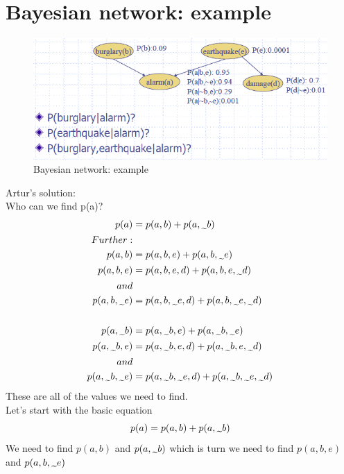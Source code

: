 \documentclass{article}
\newcommand{\midtilde}{\raisebox{-0.25\baselineskip}{\textasciitilde}}
\begin{document}
\section*{Bayesian network: example}
\begin{figure}[H]
 \centering 
\includegraphics[scale=0.65]{images/alarm.png} 
 \caption{Bayesian network: example}
 \label{fig:b-net-example}
\end{figure}
Artur's solution:\\
Who can we find p(a)? \\
\begin{align*}
p(a) & = p(a,b) + p(a,\midtilde b) \\
Further: \\
p(a,b) & = p(a,b,e) + p(a,b,\midtilde e) \\ 
p(a,b,e) & = p(a,b,e,d) + p(a,b,e,\midtilde d) \\
and \\
p(a,b,\midtilde e) & = p(a,b,\midtilde e,d) + p(a,b,\midtilde e,\midtilde d) \\
\\
p(a,\midtilde b) & = p(a,\midtilde b,e) + p(a,\midtilde b,\midtilde e) \\ 
p(a,\midtilde b,e) & = p(a,\midtilde b,e,d) + p(a,\midtilde b,e,\midtilde d) \\
and \\
p(a,\midtilde b,\midtilde e) & = p(a,\midtilde b,\midtilde e,d) + p(a,\midtilde b,\midtilde e,\midtilde d) \\
\end{align*}
These are all of the values we need to find. \\
Let's start with the basic equation
\begin{equation}
    p(a) = p(a,b) + p(a,\midtilde b) \label{eq1}
\end{equation}
We need to find $p(a,b)$ and $p(a,\midtilde b)$ which is turn we need to find $p(a,b,e)$ and $p(a,b,\midtilde e)$\\
\end{document}
